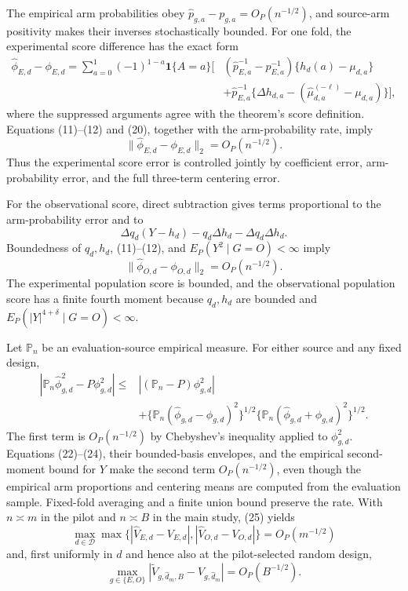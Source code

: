 The empirical arm probabilities obey \(\widehat p_{g,a}-p_{g,a}=O_P(n^{-1/2})\), and source-arm positivity makes their inverses stochastically bounded.  For one fold, the experimental score difference has the exact form
\[
\begin{aligned}
 \widehat\phi_{E,d}-\phi_{E,d}
 =\sum_{a=0}^1(-1)^{1-a}\mathbf1\{A=a\}\bigg[&
 \left(\widehat p_{E,a}^{-1}-p_{E,a}^{-1}\right)
 \{h_d(a)-\mu_{d,a}\}\\
 &+\widehat p_{E,a}^{-1}
 \{\Delta h_{d,a}-(\widehat\mu_{d,a}^{(-\ell)}-\mu_{d,a})\}
 \bigg],                                                     \tag{21}
\end{aligned}
\]
where the suppressed arguments agree with the theorem's score definition.  Equations (11)--(12) and (20), together with the arm-probability rate, imply
\[
 \|\widehat\phi_{E,d}-\phi_{E,d}\|_2=O_P(n^{-1/2}).         \tag{22}
\]
Thus the experimental score error is controlled jointly by coefficient error, arm-probability error, and the full three-term centering error.

For the observational score, direct subtraction gives terms proportional to the arm-probability error and to
\[
 \Delta q_d(Y-h_d)-q_d\Delta h_d-\Delta q_d\Delta h_d.       \tag{23}
\]
Boundedness of \(q_d,h_d\), (11)--(12), and \(E_P(Y^2\mid G=O)<\infty\) imply
\[
 \|\widehat\phi_{O,d}-\phi_{O,d}\|_2=O_P(n^{-1/2}).         \tag{24}
\]
The experimental population score is bounded, and the observational population score has a finite fourth moment because \(q_d,h_d\) are bounded and \(E_P(|Y|^{4+\delta}\mid G=O)<\infty\).

Let \(\mathbb P_n\) be an evaluation-source empirical measure.  For either source and any fixed design,
\[
\begin{aligned}
 |\mathbb P_n\widehat\phi_{g,d}^2-P\phi_{g,d}^2|
 \le{}&| (\mathbb P_n-P)\phi_{g,d}^2|\\
 &+\{\mathbb P_n(\widehat\phi_{g,d}-\phi_{g,d})^2\}^{1/2}
   \{\mathbb P_n(\widehat\phi_{g,d}+\phi_{g,d})^2\}^{1/2}. \tag{25}
\end{aligned}
\]
The first term is \(O_P(n^{-1/2})\) by Chebyshev's inequality applied to \(\phi_{g,d}^2\).  Equations (22)--(24), their bounded-basis envelopes, and the empirical second-moment bound for \(Y\) make the second term \(O_P(n^{-1/2})\), even though the empirical arm proportions and centering means are computed from the evaluation sample.  Fixed-fold averaging and a finite union bound preserve the rate.  With \(n\asymp m\) in the pilot and \(n\asymp B\) in the main study, (25) yields
\[
 \max_{d\in\mathcal D}\max\bigl\{
 |\widehat V_{E,d}-V_{E,d}|,
 |\widehat V_{O,d}-V_{O,d}|\bigr\}=O_P(m^{-1/2})             \tag{26}
\]
and, first uniformly in \(d\) and hence also at the pilot-selected random design,
\[
 \max_{g\in\{E,O\}}
 |\widetilde V_{g,\widehat d_m,B}-V_{g,\widehat d_m}|
 =O_P(B^{-1/2}).                                               \tag{27}
\]

